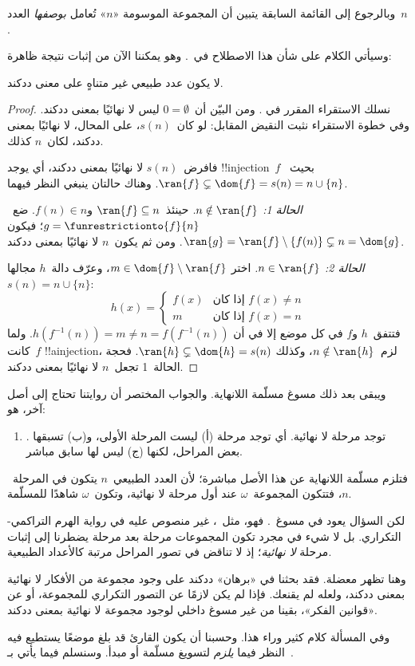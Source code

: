 \documentclass[../../../include/open-logic-section]{subfiles}
\begin{document}
وبالرجوع إلى القائمة السابقة يتبين أن المجموعة الموسومة «$n$» تُعامل
\emph{بوصفها} العدد~$n$.

وسيأتي الكلام على شأن هذا الاصطلاح في~. وهو
يمكننا الآن من إثبات نتيجة ظاهرة:

\begin{prop}
لا يكون عدد طبيعي غير متناهٍ على معنى ددكند.
\end{prop}

\begin{proof}
نسلك الاستقراء المقرر في
. ومن البيّن
أن~$0 = \emptyset$ ليس لا نهائيًا بمعنى ددكند. وفي خطوة الاستقراء نثبت
النقيض المقابل: لو كان~$s(n)$، على المحال، لا نهائيًا بمعنى ددكند،
لكان~$n$ كذلك.

فافرض~$s(n)$ لا نهائيًا بمعنى ددكند، أي يوجد !!{injection}~$f$
بحيث~$\ran{f}\subsetneq \dom{f} = s(n) = n \cup \{n\}$. وهناك حالتان
ينبغي النظر فيهما.

\emph{الحالة 1: $n \notin \ran{f}$.} حينئذ~$\ran{f} \subseteq n$
و$f(n) \in n$. ضع~$g = \funrestrictionto{f}{n}$؛ فيكون
$\ran{g} = \ran{f} \setminus \{f(n)\} \subsetneq n = \dom{g}$.
ومن ثم يكون~$n$ لا نهائيًا بمعنى ددكند.

\emph{الحالة 2: $n \in \ran{f}$.} اختر
$m \in \dom{f} \setminus \ran{f}$، وعرّف دالة~$h$ مجالها
$s(n) = n \cup \{n\}$:
\[
h(x) = 
	\begin{cases}
		f(x) & \text{إذا كان }f(x) \neq n\\
		m & \text{إذا كان }f(x)=n
	\end{cases}
\]
فتتفق~$h$ و$f$ في كل موضع إلا في أن
$h(f^{-1}(n)) = m \neq n = f(f^{-1}(n))$. ولما كانت~$f$
!!a{injection}، لزم~$n \notin \ran{h}$، وكذلك
$\ran{h} \subsetneq \dom{h} = s(n)$. فحجة الحالة~1 تجعل~$n$
لا نهائيًا بمعنى ددكند.
\end{proof}

ويبقى بعد ذلك مسوغ مسلّمة اللانهاية. والجواب المختصر أن روايتنا تحتاج
إلى أصل آخر، هو:
\begin{enumerate}
	\item[] \stagesinf. توجد مرحلة لا نهائية. أي توجد مرحلة (أ) ليست المرحلة الأولى، و(ب) تسبقها بعض المراحل، لكنها (ج) ليس لها سابق مباشر.
\end{enumerate}
فتلزم مسلّمة اللانهاية عن هذا الأصل مباشرة؛ لأن العدد الطبيعي~$n$
يتكون في المرحلة~$n$، فتتكون المجموعة~$\omega$ عند أول مرحلة لا
نهائية، وتكون~$\omega$ شاهدًا للمسلّمة.

لكن السؤال يعود في مسوغ~\stagesinf. فهو، مثل~\stagessucc، غير منصوص
عليه في رواية الهرم التراكمي-التكراري. بل لا شيء في مجرد تكون
المجموعات مرحلة بعد مرحلة يضطرنا إلى إثبات مرحلة \emph{لا نهائية}؛
إذ لا تناقض في تصور المراحل مرتبة كالأعداد الطبيعية.

وهنا تظهر معضلة. فقد بحثنا في
 «برهان» ددكند على وجود
مجموعة من الأفكار لا نهائية بمعنى ددكند، ولعله لم يقنعك. فإذا لم يكن
\stagesinf{} لازمًا عن التصور التكراري للمجموعة، أو عن «قوانين الفكر»،
بقينا من غير مسوغ داخلي لوجود مجموعة لا نهائية بمعنى ددكند.

وفي المسألة كلام كثير وراء هذا. وحسبنا أن يكون القارئ قد بلغ موضعًا
يستطيع فيه النظر فيما \emph{يلزم} لتسويغ مسلّمة أو مبدأ. وسنسلم فيما
يأتي بـ~\stagesinf{}.
\end{document}
